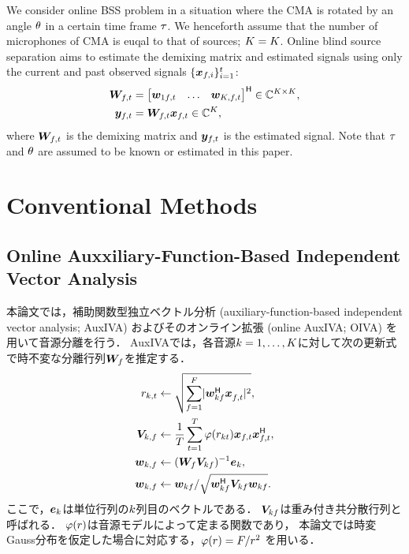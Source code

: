 \documentclass[sip,biber]{now-journal}
\begin{document}
\renewcommand{\Mic}{\Src}%
We consider online BSS problem in a situation where the CMA is rotated by an angle $\theta$ in a certain time frame $\tau$.
We henceforth assume that the number of microphones of CMA is euqal to that of sources; $\Mic = \Src$.
Online blind source separation aims to estimate the demixing matrix and estimated signals using only the current and past observed signals $\{\bm{x} _{f,i}\}_{i=1}^{t}$:
\begin{align}
  \Demix _{\ft} &= \begin{bmatrix} \demix _{1\ft} & \dots & \demix _{\Src,\ft} \end{bmatrix} ^{\hermite} \in \C ^{\Src \times \Mic}, \\
  \Est _{\ft} &= \Demix _{\ft} \Obs _{\ft} \in \C ^{\Src},
\end{align}
where $\Demix _{\ft}$ is the demixing matrix and $\Est _{\ft}$ is the estimated signal.
Note that $\tau$ and $\theta$ are assumed to be known or estimated in this paper.%

\section{Conventional Methods}

\subsection{Online Auxxiliary-Function-Based Independent Vector Analysis}

本論文では，補助関数型独立ベクトル分析 (auxiliary-function-based independent vector analysis; AuxIVA) \cite{Ono:2011:WASPAA}
およびそのオンライン拡張 (online AuxIVA; OIVA) \cite{Taniguchi:2014:HSCMA} を用いて音源分離を行う．
AuxIVAでは，各音源$k = 1, \dots, K$に対して次の更新式で時不変な分離行列$\bm{W} _{f}$を推定する．
\begin{align}
  \var _{\src,\tframe} &\gets \sqrt{\sum _{\freq=1} ^{\Freq} \lvert \demix ^{\hermite} _{\src\freq} \Obs ^{\nohermite}_{\ft} \rvert ^2}, \\
  \cov _{\src,\freq} &\gets \frac{1}{\Tframe} \sum _{\tframe=1} ^{\Tframe} \weight (\var_{\src\tframe}) \Obs _{\ft} \Obs _{\ft}^{\hermite}, \\
  \demix _{\src,\freq} &\gets (\Demix _{\freq} \cov _{\src\freq}) ^{-1} \eye _{\src} \label{eq:ip:proj}, \\
  \demix _{\src,\freq} &\gets {\demix _{\src\freq}} / {\sqrt{\demix _{\src\freq} ^{\hermite} \cov _{\src\freq} \demix _{\src\freq}}} \label{eq:ip:norm}.
\end{align}
ここで，$\bm{e} _{k}$は単位行列の$k$列目のベクトルである．
$\bm{V} _{kf}$は{重み付き共分散行列}と呼ばれる．
$\varphi(r)$は音源モデルによって定まる関数であり，
本論文では時変Gauss分布を仮定した場合に対応する，$\varphi (r) = F/{r ^2}$ \cite{Ono:2012:APSIPA}を用いる．
\end{document}
